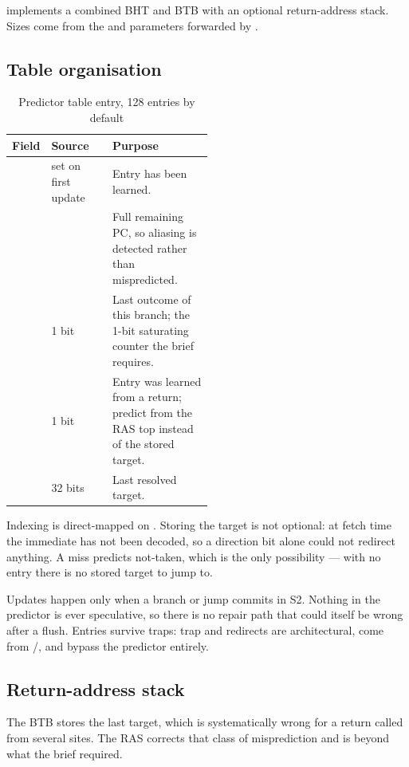  implements a combined BHT and BTB with an optional
return-address stack. Sizes come from the  and 
parameters forwarded by .

\subsection{Table organisation}

\begin{table}[H]
\centering
\caption{Predictor table entry, 128 entries by default}
\label{tab:btb}
\begin{tabular}{@{}llL{0.5\linewidth}@{}}
\toprule
\textbf{Field} & \textbf{Source} & \textbf{Purpose} \\
\midrule
{}  & set on first update & Entry has been learned. \\
    &       & Full remaining PC, so aliasing is detected rather than mispredicted. \\
  & 1 bit               & Last outcome of this branch; the 1-bit saturating counter the brief requires. \\
  & 1 bit               & Entry was learned from a return; predict from the RAS top instead of the stored target. \\
 & 32 bits             & Last resolved target. \\
\bottomrule
\end{tabular}
\end{table}

Indexing is direct-mapped on . Storing the target is not optional:
at fetch time the immediate has not been decoded, so a direction bit alone could
not redirect anything. A miss predicts not-taken, which is the only possibility
--- with no entry there is no stored target to jump to.

Updates happen only when a branch or jump commits in S2. Nothing in the predictor
is ever speculative, so there is no repair path that could itself be wrong after
a flush. Entries survive traps: trap and  redirects are architectural,
come from /, and bypass the predictor entirely.

\subsection{Return-address stack}

The BTB stores the last target, which is systematically wrong for a return called
from several sites. The RAS corrects that class of misprediction and is beyond
what the brief required.

